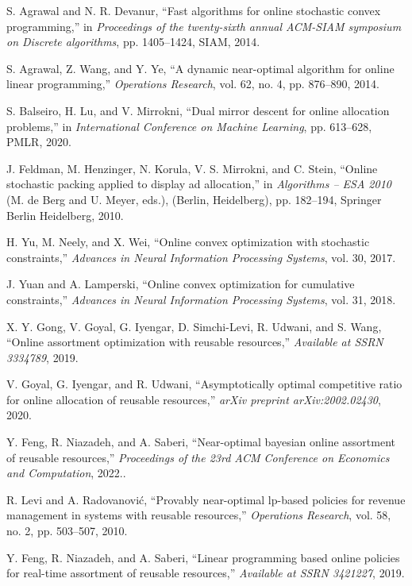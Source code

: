 \documentclass[letterpaper, 10 pt, conference]{ieeeconf}  %
\theoremstyle{plain}
\theoremstyle{definition}
\theoremstyle{remark}
\begin{document}
\begin{thebibliography}{99}
S. Agrawal and N. R. Devanur, “Fast algorithms for online stochastic convex programming,” in \textit{Proceedings of the twenty-sixth annual ACM-SIAM symposium on
Discrete algorithms}, pp. 1405–1424, SIAM, 2014.

S. Agrawal, Z. Wang, and Y. Ye, “A dynamic near-optimal algorithm for online linear programming,” \textit{Operations Research}, vol. 62, no. 4, pp. 876–890, 2014.

S. Balseiro, H. Lu, and V. Mirrokni, “Dual mirror descent for online allocation problems,” in \textit{International
Conference on Machine Learning}, pp. 613–628, PMLR, 2020.

J. Feldman, M. Henzinger, N. Korula, V. S. Mirrokni, and C. Stein, “Online stochastic packing applied to
display ad allocation,” in \textit{Algorithms – ESA 2010} (M. de Berg and U. Meyer, eds.), (Berlin, Heidelberg), pp. 182–194, Springer Berlin Heidelberg, 2010.

H. Yu, M. Neely, and X. Wei, “Online convex optimization with stochastic constraints,” \textit{Advances in Neural
Information Processing Systems}, vol. 30, 2017.

J. Yuan and A. Lamperski, “Online convex optimization for cumulative constraints,” \textit{Advances in Neural
Information Processing Systems}, vol. 31, 2018.

X. Y. Gong, V. Goyal, G. Iyengar, D. Simchi-Levi, R. Udwani, and S. Wang, “Online assortment optimization with reusable resources,” \textit{Available at SSRN 3334789}, 2019.

V. Goyal, G. Iyengar, and R. Udwani, “Asymptotically optimal competitive ratio for online allocation of
reusable resources,” \textit{arXiv preprint arXiv:2002.02430}, 2020.

Y. Feng, R. Niazadeh, and A. Saberi, “Near-optimal bayesian online assortment of reusable resources,” \textit{Proceedings of the 23rd ACM Conference on Economics and Computation}, 2022..

R. Levi and A. Radovanović, “Provably near-optimal lp-based policies for revenue management in systems with reusable resources,” \textit{Operations Research}, vol. 58, no. 2, pp. 503–507, 2010.

Y. Feng, R. Niazadeh, and A. Saberi, “Linear programming based online policies for real-time assortment of
reusable resources,” \textit{Available at SSRN 3421227}, 2019.


\end{thebibliography}
\end{document}
